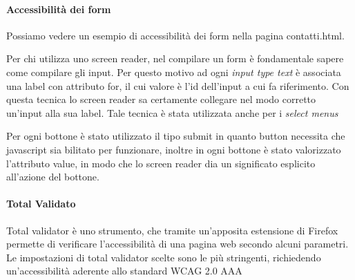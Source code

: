 \paragraph{Accessibilità dei form}

Possiamo vedere un esempio di accessibilità dei form nella pagina contatti.html.

Per chi utilizza uno screen reader, nel compilare un form è fondamentale sapere come compilare gli input. Per questo motivo ad ogni \emph{input type text} è associata una label con attributo for, il cui valore è l'id dell'input a cui fa riferimento. Con questa tecnica lo screen reader sa certamente collegare nel modo corretto un'input alla sua label.
Tale tecnica è stata utilizzata anche per i \emph{select menus}

Per ogni bottone è stato utilizzato il tipo submit in quanto button necessita che javascript sia bilitato per funzionare, inoltre in ogni bottone è stato valorizzato l'attributo value, in modo che lo screen reader dia un significato esplicito all'azione del bottone.

\paragraph{Total Validato}
Total validator è uno strumento, che tramite un'apposita estensione di Firefox permette di verificare l'accessibilità di una pagina web secondo alcuni parametri.
Le impostazioni di total validator scelte sono le più stringenti, richiedendo un'accessibilità aderente allo standard WCAG 2.0 AAA


